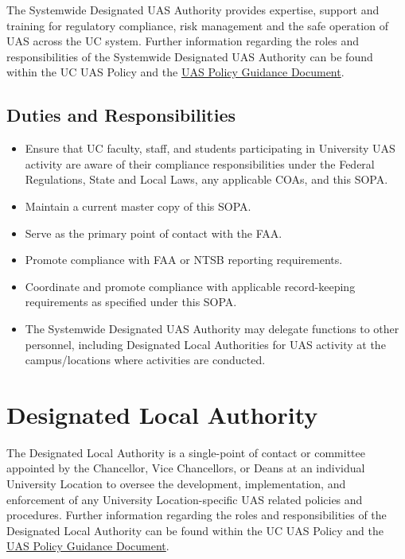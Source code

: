 \documentclass[
]{book}
\providecommand{\tightlist}{%
  \setlength{\itemsep}{0pt}\setlength{\parskip}{0pt}}
\begin{document}
The Systemwide Designated UAS Authority provides expertise, support and training for regulatory compliance, risk management and the safe operation of UAS across the UC system. Further information regarding the roles and responsibilities of the Systemwide Designated UAS Authority can be found within the UC UAS Policy and the \href{https://ucdrones.github.io/Policy_Guidance/}{UAS Policy Guidance Document}.

\hypertarget{duties-and-responsibilities}{%
\subsection{Duties and Responsibilities}\label{duties-and-responsibilities}}

\begin{itemize}
\tightlist
\item
  Ensure that UC faculty, staff, and students participating in University UAS activity are aware of their compliance responsibilities under the Federal Regulations, State and Local Laws, any applicable COAs, and this SOPA.
\item
  Maintain a current master copy of this SOPA.
\item
  Serve as the primary point of contact with the FAA.
\item
  Promote compliance with FAA or NTSB reporting requirements.
\item
  Coordinate and promote compliance with applicable record-keeping requirements as specified under this SOPA.
\item
  The Systemwide Designated UAS Authority may delegate functions to other personnel, including Designated Local Authorities for UAS activity at the campus/locations where activities are conducted.
\end{itemize}

\hypertarget{designated-local-authority}{%
\section{Designated Local Authority}\label{designated-local-authority}}

The Designated Local Authority is a single-point of contact or committee appointed by the Chancellor, Vice Chancellors, or Deans at an individual University Location to oversee the development, implementation, and enforcement of any University Location-specific UAS related policies and procedures. Further information regarding the roles and responsibilities of the Designated Local Authority can be found within the UC UAS Policy and the \href{https://ucdrones.github.io/Policy_Guidance/}{UAS Policy Guidance Document}.
\end{document}

